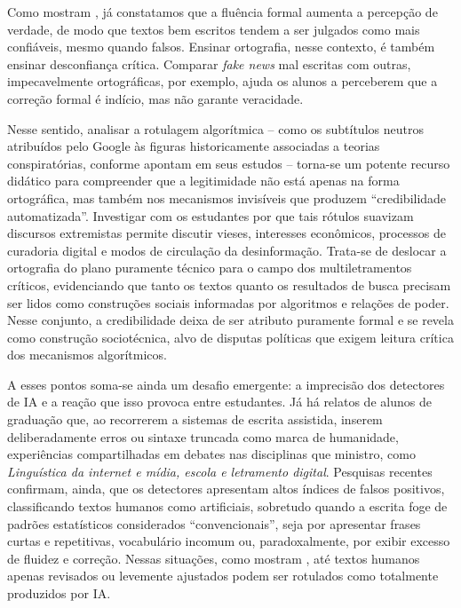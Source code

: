 \documentclass[portuguese]{textolivre}
\begin{document}
Como mostram \textcite{fazio2015illusorytruth}, já constatamos que a fluência formal aumenta a percepção de verdade, de modo que textos bem escritos tendem a ser julgados como mais confiáveis, mesmo quando falsos. Ensinar ortografia, nesse contexto, é também ensinar desconfiança crítica. Comparar \textit{fake news} mal escritas com outras, impecavelmente ortográficas, por exemplo, ajuda os alunos a perceberem que a correção formal é indício, mas não garante veracidade.

Nesse sentido, analisar a rotulagem algorítmica – como os subtítulos neutros atribuídos pelo Google às figuras historicamente associadas a teorias conspiratórias, conforme apontam \textcite{alrawi2022autocomplete} em seus estudos – torna-se um potente recurso didático para compreender que a legitimidade não está apenas na forma ortográfica, mas também nos mecanismos invisíveis que produzem “credibilidade automatizada”. Investigar com os estudantes por que tais rótulos suavizam discursos extremistas permite discutir vieses, interesses econômicos, processos de curadoria digital e modos de circulação da desinformação. Trata-se de deslocar a ortografia do plano puramente técnico para o campo dos multiletramentos críticos, evidenciando que tanto os textos quanto os resultados de busca precisam ser lidos como construções sociais informadas por algoritmos e relações de poder. Nesse conjunto, a credibilidade deixa de ser atributo puramente formal e se revela como construção sociotécnica, alvo de disputas políticas que exigem leitura crítica dos mecanismos algorítmicos.

A esses pontos soma-se ainda um desafio emergente: a imprecisão dos detectores de IA e a reação que isso provoca entre estudantes. Já há relatos de alunos de graduação que, ao recorrerem a sistemas de escrita assistida, inserem deliberadamente erros ou sintaxe truncada como marca de humanidade, experiências compartilhadas em debates nas disciplinas que ministro, como \textit{Linguística da internet e mídia, escola e letramento digital}. Pesquisas recentes confirmam, ainda, que os detectores apresentam altos índices de falsos positivos, classificando textos humanos como artificiais, sobretudo quando a escrita foge de padrões estatísticos considerados “convencionais”, seja por apresentar frases curtas e repetitivas, vocabulário incomum ou, paradoxalmente, por exibir excesso de fluidez e correção. Nessas situações, como mostram \textcite{saha2025almostai}, até textos humanos apenas revisados ou levemente ajustados podem ser rotulados como totalmente produzidos por IA.
\end{document}
